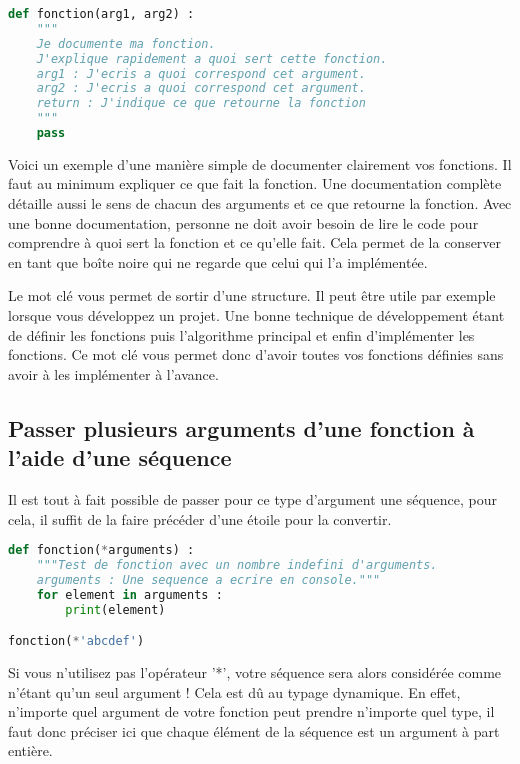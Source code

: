 \documentclass[a4paper,twoside]{article}
\begin{document}
\begin{lstlisting}[language=python]
def fonction(arg1, arg2) :
    """
    Je documente ma fonction. 
    J'explique rapidement a quoi sert cette fonction.
    arg1 : J'ecris a quoi correspond cet argument.
    arg2 : J'ecris a quoi correspond cet argument.
    return : J'indique ce que retourne la fonction
    """
    pass
\end{lstlisting}

Voici un exemple d'une manière simple de documenter clairement vos fonctions. Il faut au minimum expliquer ce que fait la fonction. Une documentation complète détaille aussi le sens de chacun des arguments et ce que retourne la fonction. Avec une bonne documentation, personne ne doit avoir besoin de lire le code pour comprendre à quoi sert la fonction et ce qu'elle fait. Cela permet de la conserver en tant que boîte noire qui ne regarde que celui qui l'a implémentée.

\begin{remarque}
Le mot clé  vous permet de sortir d'une structure. Il peut être utile par exemple lorsque vous développez un projet. Une bonne technique de développement étant de définir les fonctions puis l'algorithme principal et enfin d'implémenter les fonctions. Ce mot clé vous permet donc d'avoir toutes vos fonctions définies sans avoir à les implémenter à l'avance.
\end{remarque}

\subsection{Passer plusieurs arguments d'une fonction à l'aide d'une séquence}\label{sec:args_liste}
Il est tout à fait possible de passer pour ce type d'argument une séquence, pour cela, il suffit de la faire précéder d'une étoile pour la convertir.

\begin{lstlisting}[language=python]
def fonction(*arguments) :
    """Test de fonction avec un nombre indefini d'arguments.
    arguments : Une sequence a ecrire en console."""
    for element in arguments :
        print(element)

fonction(*'abcdef')
\end{lstlisting}

Si vous n'utilisez pas l'opérateur '*', votre séquence sera alors considérée comme n'étant qu'un seul argument ! Cela est dû au typage dynamique. En effet, n'importe quel argument de votre fonction peut prendre n'importe quel type, il faut donc préciser ici que chaque élément de la séquence est un argument à part entière.
\end{document}
